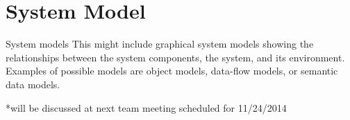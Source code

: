 \clearpage
\section{System Model}

\begin{figure}[H]
\end{figure}

System models This might include graphical system models showing the relationships between
the system components, the system, and its environment. Examples of possible
models are object models, data-flow models, or semantic data models.

*will be discussed at next team meeting scheduled for 11/24/2014
